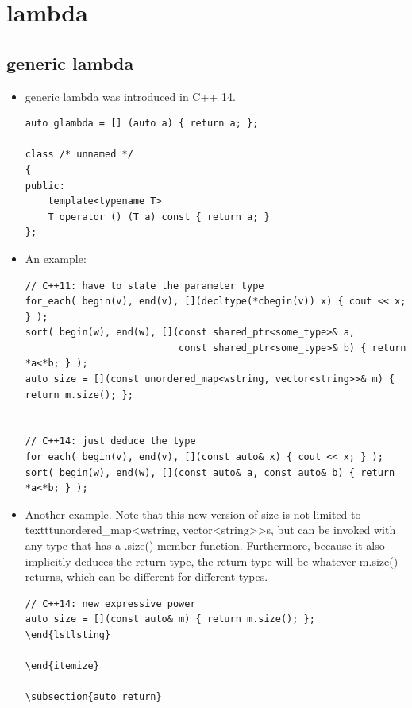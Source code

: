 \documentclass[a4paper,11pt,twoside]{book}
\begin{document}
\section{lambda}
\subsection{generic lambda}
\begin{itemize}
		\item generic lambda was introduced in C++ 14. 
\begin{lstlisting}
auto glambda = [] (auto a) { return a; };

class /* unnamed */
{
public:
    template<typename T>
    T operator () (T a) const { return a; }
};
\end{lstlisting}
		\item An example:

\begin{lstlisting}
// C++11: have to state the parameter type
for_each( begin(v), end(v), [](decltype(*cbegin(v)) x) { cout << x; } );
sort( begin(w), end(w), [](const shared_ptr<some_type>& a, 
                           const shared_ptr<some_type>& b) { return *a<*b; } );
auto size = [](const unordered_map<wstring, vector<string>>& m) { return m.size(); };


// C++14: just deduce the type
for_each( begin(v), end(v), [](const auto& x) { cout << x; } );
sort( begin(w), end(w), [](const auto& a, const auto& b) { return *a<*b; } );
\end{lstlisting}

		\item Another example.  Note that this new version of size is not limited to \/texttt{unordered_map<wstring, vector<string>>s}, but can be invoked with any type that has a .size() member function. Furthermore, because it also implicitly deduces the return type, the return type will be whatever m.size() returns, which can be different for different types.

\begin{lstlisting}
// C++14: new expressive power
auto size = [](const auto& m) { return m.size(); };
\end{lstlsting}

\end{itemize}

\subsection{auto return}


\end{lstlisting}
\end{itemize}
\end{document}
